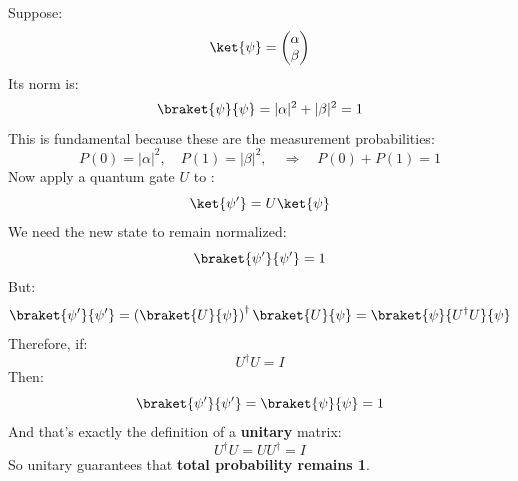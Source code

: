 \begin{remarkbox}
     Suppose:
    \begin{equation*}
        \ket{\psi} =
        \begin{pmatrix}
            \alpha \\
            \beta
        \end{pmatrix}
    \end{equation*}
    Its norm is:
    \begin{equation*}
        \braket{\psi}{\psi} = |\alpha|^2 + |\beta|^2 = 1
    \end{equation*}
    This is fundamental because these are the measurement probabilities:
    \begin{equation*}
        P(0) = |\alpha|^2, \quad P(1) = |\beta|^2, \quad \Rightarrow \quad P(0) + P(1) = 1
    \end{equation*}
    Now apply a quantum gate $U$ to \ket{\psi}:
    \begin{equation*}
        \ket{\psi'} = U\ket{\psi}
    \end{equation*}
    We need the new state to remain normalized:
    \begin{equation*}
        \braket{\psi'}{\psi'} = 1
    \end{equation*}
    But:
    \begin{equation*}
        \braket{\psi'}{\psi'} = \left(\braket{U}{\psi}\right)^{\dagger} \braket{U}{\psi} = \braket{\psi}{U^{\dagger}U}{\psi}
    \end{equation*}
    Therefore, if:
    \begin{equation*}
        U^{\dagger}U = I
    \end{equation*}
    Then:
    \begin{equation*}
        \braket{\psi'}{\psi'} = \braket{\psi}{\psi} = 1
    \end{equation*}
    And that's exactly the definition of a \textbf{unitary} matrix:
    \begin{equation*}
        U^{\dagger}U = UU^{\dagger} = I
    \end{equation*}
    So unitary guarantees that \textbf{total probability remains 1}.


\end{remarkbox}
